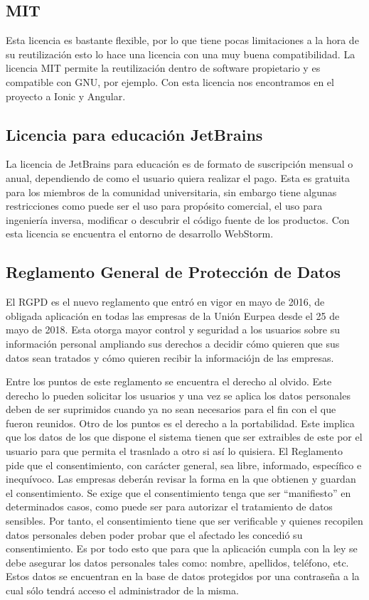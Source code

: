 \subsection{MIT}
Esta licencia es bastante flexible, por lo que tiene pocas limitaciones a la hora
de su reutilización esto lo hace una licencia con una muy buena compatibilidad. La
licencia MIT permite la reutilización dentro de software propietario y es compatible
con GNU, por ejemplo. Con esta licencia nos encontramos en el proyecto a Ionic y Angular.

\subsection{Licencia para educación JetBrains}
La licencia de JetBrains para educación es de formato de suscripción mensual o anual,
dependiendo de como el usuario quiera realizar el pago. Esta es gratuita para los
miembros de la comunidad universitaria, sin embargo tiene algunas restricciones como
puede ser el uso para propósito comercial, el uso para ingeniería inversa, modificar
o descubrir el código fuente de los productos. Con esta licencia se encuentra el
entorno de desarrollo WebStorm.

\subsection{Reglamento General de Protección de Datos}
El RGPD es el nuevo reglamento que entró en vigor en mayo de 2016, de obligada
aplicación en todas las empresas de la Unión Eurpea desde el 25 de mayo de 2018.
Esta otorga mayor control y seguridad a los usuarios sobre su información personal
ampliando sus derechos a decidir cómo quieren que sus datos sean tratados y cómo
quieren recibir la informaciójn de las empresas.

\medskip
Entre los puntos de este reglamento se encuentra el derecho al olvido. Este derecho
lo pueden solicitar los usuarios y una vez se aplica los datos personales deben de ser
suprimidos cuando ya no sean necesarios para el fin con el que fueron reunidos. Otro
de los puntos es el derecho a la portabilidad. Este implica que los datos de los que
dispone el sistema tienen que ser extraibles de este por el usuario para que permita
el trasnlado a otro si así lo quisiera. El Reglamento pide que el consentimiento,
con carácter general, sea libre, informado, específico e inequívoco. Las empresas
deberán revisar la forma en la que obtienen y guardan el consentimiento.
Se exige que el consentimiento tenga que ser
“manifiesto” en determinados casos, como puede ser para autorizar el
tratamiento de datos sensibles. Por tanto, el consentimiento tiene que ser
verificable y quienes recopilen datos personales deben poder probar que el
afectado les concedió su consentimiento. Es por todo esto que para que la aplicación
cumpla con la ley se debe asegurar los datos personales tales como: nombre, apellidos,
teléfono, etc. Estos datos se encuentran en la base de datos protegidos por una contraseña
a la cual sólo tendrá acceso el administrador de la misma.